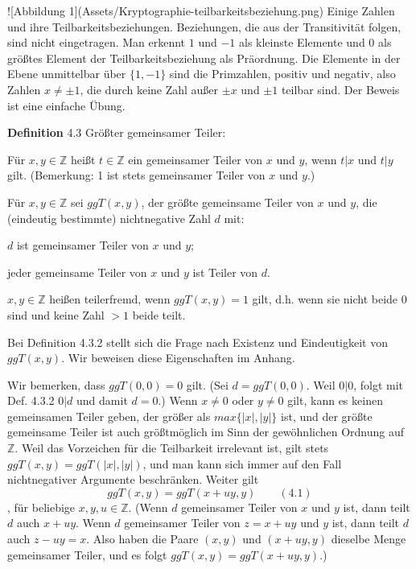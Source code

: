 \documentclass[a4paper]{article}
\begin{document}
\begin{multicols}{3}
    ![Abbildung 1](Assets/Kryptographie-teilbarkeitsbeziehung.png)
    Einige Zahlen und ihre Teilbarkeitsbeziehungen. Beziehungen, die aus der Transitivität folgen, sind nicht eingetragen. Man erkennt $1$ und $-1$ als kleinste Elemente und $0$ als größtes Element der Teilbarkeitsbeziehung als Präordnung. Die Elemente in der Ebene unmittelbar über $\{1,-1\}$ sind die Primzahlen, positiv und negativ, also Zahlen $x\not=\pm 1$, die durch keine Zahl außer $\pm x$ und $\pm 1$ teilbar sind.
    Der Beweis ist eine einfache Übung.

    \textbf{Definition} 4.3 Größter gemeinsamer Teiler:
    \begin{enumerate*}
        \item Für $x,y\in\mathbb{Z}$ heißt $t\in\mathbb{Z}$ ein gemeinsamer Teiler von $x$ und $y$, wenn $t|x$ und $t|y$ gilt. (Bemerkung: 1 ist stets gemeinsamer Teiler von $x$ und $y$.)
        \item Für $x,y\in\mathbb{Z}$ sei $ggT(x, y)$, der größte gemeinsame Teiler von $x$ und $y$, die (eindeutig bestimmte) nichtnegative Zahl $d$ mit:
        \begin{itemize*}
            \item $d$ ist gemeinsamer Teiler von $x$ und $y$;
            \item jeder gemeinsame Teiler von $x$ und $y$ ist Teiler von $d$.
        \end{itemize*}
        \item $x,y\in\mathbb{Z}$ heißen teilerfremd, wenn $ggT(x,y)=1$ gilt, d.h. wenn sie nicht beide $0$ sind und keine Zahl $>1$ beide teilt.
    \end{enumerate*}

    Bei Definition 4.3.2 stellt sich die Frage nach Existenz und Eindeutigkeit von $ggT(x,y)$. Wir beweisen diese Eigenschaften im Anhang.

    Wir bemerken, dass $ggT(0,0) = 0$ gilt. (Sei $d = ggT(0,0)$. Weil $0|0$, folgt mit Def. 4.3.2 $0|d$ und damit $d=0$.) Wenn $x\not= 0$ oder $y\not= 0$ gilt, kann es keinen gemeinsamen Teiler geben, der größer als $max\{|x|,|y|\}$ ist, und der größte gemeinsame Teiler ist auch größtmöglich im Sinn der gewöhnlichen Ordnung auf $\mathbb{Z}$. Weil das Vorzeichen für die Teilbarkeit irrelevant ist, gilt stets $ggT(x,y) = ggT(|x|,|y|)$, und man kann sich immer auf den Fall nichtnegativer Argumente beschränken. Weiter gilt $$ggT(x,y) = ggT(x+uy,y) \quad\quad(4.1)$$, für beliebige $x,y,u\in\mathbb{Z}$. (Wenn $d$ gemeinsamer Teiler von $x$ und $y$ ist, dann teilt $d$ auch $x+uy$. Wenn $d$ gemeinsamer Teiler von $z=x+uy$ und $y$ ist, dann teilt $d$ auch $z-uy =x$. Also haben die Paare $(x,y)$ und $(x+uy,y)$ dieselbe Menge gemeinsamer Teiler, und es folgt $ggT(x,y) = ggT(x+uy,y)$.)


\end{multicols}
\end{document}
